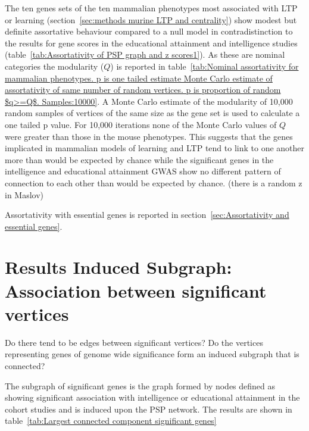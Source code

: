     The ten genes sets of the ten mammalian phenotypes most associated with LTP or learning (section~\ref{sec:methods murine LTP and centrality}) show modest but definite assortative behaviour compared to a null model in contradistinction to the results for gene scores in the educational attainment and intelligence studies (table~\ref{tab:Assortativity of PSP graph and z scores1}). As these are nominal categories the modularity ($Q$) is reported in table~\ref{tab:Nominal assortativity for mammalian phenotypes. p is one tailed estimate Monte Carlo estimate of assortativity of same number of random vertices. p is proportion of random $q>=Q$. Samples:10000}. A Monte Carlo estimate of the modularity of 10,000 random samples of vertices of the same size as the gene set is used to calculate a one tailed p value. For 10,000 iterations none of the Monte Carlo values of $Q$ were greater than those in the mouse phenotypes. This suggests that the genes implicated in mammalian models of learning and LTP tend to link to one another more than would be expected by chance while the significant genes in the intelligence and educational attainment GWAS show no different pattern of connection to each other than would be expected by chance. (there is a random z in Maslov)
 
 
 
 Assortativity with essential genes is reported in section~\ref{sec:Assortativity and essential genes}.
\clearpage
\section{Results Induced Subgraph: Association between significant vertices}
Do there tend to be edges between significant vertices? Do the vertices representing genes of genome wide significance form an induced subgraph that is connected?



The subgraph of significant genes is the graph formed by nodes defined as showing significant association with intelligence or educational attainment in the cohort studies and is induced upon the PSP network. The results are shown in table~\ref{tab:Largest connected component significant genes}

